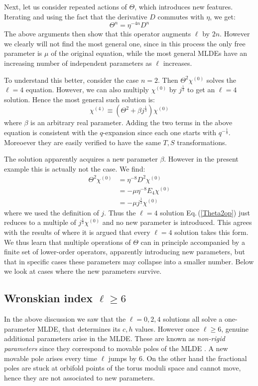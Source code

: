 \documentclass[11pt]{article}
\newcommand\be{\begin{equation}}
\newcommand\ee{\end{equation}}
\newcommand{\eref}[1]{Eq.\,(\ref{#1})}
\begin{document}
Next, let us consider repeated actions of $\Theta$, which introduces new features. Iterating and using the fact that the derivative $D$ commutes with $\eta$, we get:
\be
\Theta^n =\eta^{-4n}D^n
\ee
The above arguments then show that this operator augments $\ell$ by $2n$. However we clearly will not find the most general one, since in this process the only free parameter is $\mu$ of the original equation, while the most general MLDEs have an increasing number of independent parameters as $\ell$ increases.

To understand this better, consider the case $n=2$. Then $\Theta^2\chi^{(0)}$ solves the $\ell=4$ equation. However, we can also multiply $\chi^{(0)}$ by $j^\frac13$ to get an $\ell=4$ solution. Hence the most general such solution is:
\be
\chi^{(4)}\equiv(\Theta^2+\beta j^\frac13)\chi^{(0)}
\label{Theta2op}
\ee
where $\beta$ is an arbitrary real parameter. Adding the two terms in the above equation is consistent with the $q$-expansion since each one starts with $q^{-\frac13}$. Moreoever they are easily verified to have the same $T,S$ transformations.

The solution apparently acquires a new parameter $\beta$.  However in the present example this is actually not the case. We find:
\be\label{red}
\begin{split}
\Theta^2 \chi^{(0)} &= \eta^{-8}D^2\chi^{(0)}\\
& = -\mu\eta^{-8}E_4\chi^{(0)}\\
&= -\mu j^\frac13\chi^{(0)}
\end{split}
\ee
where we used the definition of $j$. Thus the $\ell=4$ solution \eref{Theta2op} just reduces to a multiple of $j^\frac13\chi^{(0)}$ and no new parameter is introduced. This agrees with the results of \cite{Chandra:2018pjq, Das:2023qns} where it is argued that every $\ell=4$ solution takes this form. We thus learn that multiple operations of $\Theta$ can in principle accompanied by a finite set of lower-order operators, apparently introducing new parameters, but that in specific cases these parameters may collapse into a smaller number. Below we look at cases where the new parameters survive.

\subsection{Wronskian index $\ell \ge 6$}

In the above discussion we saw that the $\ell=0,2,4$ solutions all solve a one-parameter MLDE, that determines its $c,h$ values. However once $\ell\ge 6$, genuine additional parameters arise in the MLDE. These are known as {\it non-rigid parameters} since they correspond to movable poles of the MLDE \cite{Das:2023qns}. A new movable pole arises every time $\ell$ jumps by 6. On the other hand the fractional poles are stuck at orbifold points of the torus moduli space and cannot move, hence they are not associated to new parameters. 
\end{document}
